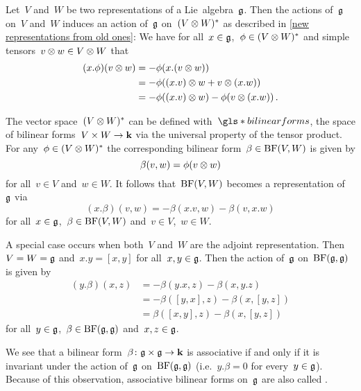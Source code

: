 \begin{remark}
  Let~$V$ and~$W$ be two representations of a Lie~algebra~$\mathfrak{g}$.
  Then the actions of~$\mathfrak{g}$ on~$V$ and~$W$ induces an action of~$\mathfrak{g}$ on~$(V \otimes W)^*$ as described in \cref{new representations from old ones}:
  We have for all~$x \in \mathfrak{g}$,~$\phi \in (V \otimes W)^*$ and simple tensors~$v \otimes w \in V \otimes W$ that
  \begin{align*}
    (x.\phi)(v \otimes w)
    &=
    - \phi(x.(v \otimes w))
    \\
    &=
    - \phi((x.v) \otimes w + v \otimes (x.w))
    \\
    &=
    - \phi((x.v) \otimes w) - \phi(v \otimes (x.w)) \,.
  \end{align*}
  
  The vector space~$(V \otimes W)^*$ can be defined with~$\gls*{bilinear forms}$, the space of bilinear forms~$V \times W \to \mathbf{k}$ via the universal property of the tensor product.
  For any~$\phi \in (V \otimes W)^*$ the corresponding bilinear form~$\beta \in \operatorname{BF}(V,W)$ is given by
  \[
    \beta(v,w)
    =
    \phi(v \otimes w)
  \]
  for all~$v \in V$ and~$w \in W$.
  It follows that~$\operatorname{BF}(V,W)$ becomes a representation of~$\mathfrak{g}$ via
  \[
    (x.\beta)(v,w)
    =
    - \beta(x.v,w) - \beta(v,x.w)
  \]
  for all~$x \in \mathfrak{g}$,~$\beta \in \operatorname{BF}(V,W)$ and~$v \in V$,~$w \in W$.
  
  A special case occurs when both~$V$ and~$W$ are the adjoint representation.
  Then~$V = W = \mathfrak{g}$ and~$x.y = [x,y]$ for all~$x, y \in \mathfrak{g}$.
  Then the action of~$\mathfrak{g}$ on~$\operatorname{BF}(\mathfrak{g},\mathfrak{g})$ is given by
  \begin{align*}
    (y.\beta)(x,z)
    &=
    - \beta(y.x, z) - \beta(x, y.z)
    \\
    &=
    - \beta([y,x], z) - \beta(x, [y,z])
    \\
    &=
    \beta([x,y], z) - \beta(x, [y,z])
  \end{align*}
  for all~$y \in \mathfrak{g}$,~$\beta \in \operatorname{BF}(\mathfrak{g}, \mathfrak{g})$ and~$x, z \in \mathfrak{g}$.
  
  We see that a bilinear form~$\beta \colon \mathfrak{g} \times \mathfrak{g} \to \mathbf{k}$ is associative if and only if it is invariant under the action of~$\mathfrak{g}$ on~$\operatorname{BF}(\mathfrak{g}, \mathfrak{g})$ (i.e.~$y.\beta = 0$ for every~$y \in \mathfrak{g}$).
  Because of this observation, associative bilinear forms on~$\mathfrak{g}$ are also called .
\end{remark}


